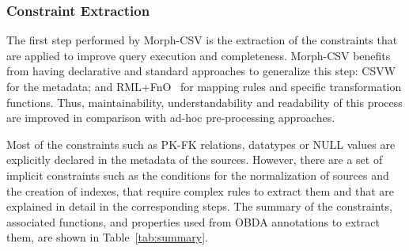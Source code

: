 \subsubsection*{Constraint Extraction}
The first step performed by Morph-CSV is the extraction of the constraints that are applied to improve query execution and completeness. Morph-CSV benefits from having declarative and standard approaches to generalize this step: CSVW~\citep{tennison2015model} for the metadata; and RML+FnO~\citep{de2017declarative} for mapping rules and specific transformation functions. Thus, maintainability, understandability and readability of this process are improved in comparison with ad-hoc pre-processing approaches. 

Most of the constraints such as PK-FK relations, datatypes or NULL values are explicitly declared in the metadata of the sources. However, there are a set of implicit constraints such as the conditions for the normalization of sources and the creation of indexes, that require complex rules to extract them and that are explained in detail in the corresponding steps. The summary of the constraints, associated functions, and properties used from OBDA annotations to extract them, are shown in Table~\ref{tab:summary}.


